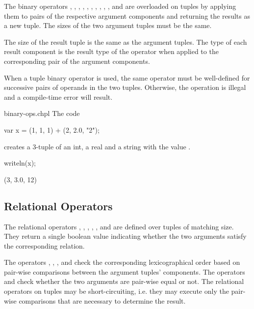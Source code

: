 The binary operators \chpl{\+}, \chpl{\-}, \chpl{\*}, \chpl{\/}, \chpl{\%},
\chpl{\*\*}, \chpl{\&}, \chpl{\|}, \chpl{\^}, \chpl{\<\<}, and \chpl{\>\>}
are overloaded on tuples by applying them to pairs of the respective
argument components and returning the results as a new tuple.
The sizes of the two argument tuples must be the same.

The size of the result tuple is the same as the argument tuples.  The
type of each result component is the result type of the operator when
applied to the corresponding pair of the argument components.

When a tuple binary operator is used, the same operator must be
well-defined for successive pairs of operands in the two tuples.
Otherwise, the operation is illegal and a compile-time error will
result.

\begin{chapelexample}{binary-ops.chpl}
The code
\begin{chapel}
var x = (1, 1, 1) + (2, 2.0, "2");
\end{chapel}
creates a 3-tuple of an int, a real and a string with the value .
\begin{chapelpost}
writeln(x);
\end{chapelpost}
\begin{chapeloutput}
(3, 3.0, 12)
\end{chapeloutput}
\end{chapelexample}


\subsection{Relational Operators}
\label{Tuple_Relational_Operators}


The relational operators \chpl{\>}, \chpl{\>\=}, \chpl{\<}, \chpl{\<\=},
\chpl{\=\=}, and \chpl{\!\=} are defined over tuples of matching size.
They return a single boolean value indicating whether the two
arguments satisfy the corresponding relation.

The operators \chpl{\>}, \chpl{\>\=}, \chpl{\<}, and \chpl{\<\=}
check the corresponding lexicographical order
based on pair-wise comparisons between the argument tuples' components.
The operators \chpl{\=\=} and \chpl{\!\=} check whether
the two arguments are pair-wise equal or not.
The relational operators on tuples may be short-circuiting, i.e.
they may execute only the pair-wise comparisons that are necessary
to determine the result.

